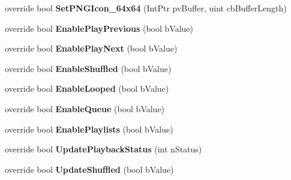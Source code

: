 \begin{DoxyCompactItemize}
override bool {\bfseries Set\+P\+N\+G\+Icon\+\_\+64x64} (Int\+Ptr pv\+Buffer, uint cb\+Buffer\+Length)
\item 
\mbox{\label{class_valve_1_1_steamworks_1_1_c_steam_music_remote_ae067653d7677e84907af56541c45c9e1}} 
override bool {\bfseries Enable\+Play\+Previous} (bool b\+Value)
\item 
\mbox{\label{class_valve_1_1_steamworks_1_1_c_steam_music_remote_a3e748d77856eb53e04e51a46e5579b48}} 
override bool {\bfseries Enable\+Play\+Next} (bool b\+Value)
\item 
\mbox{\label{class_valve_1_1_steamworks_1_1_c_steam_music_remote_a01a378e8d8ba52f35a26e26b49ae6fa8}} 
override bool {\bfseries Enable\+Shuffled} (bool b\+Value)
\item 
\mbox{\label{class_valve_1_1_steamworks_1_1_c_steam_music_remote_aa6c398cd2b4f545b9efc371d974858c4}} 
override bool {\bfseries Enable\+Looped} (bool b\+Value)
\item 
\mbox{\label{class_valve_1_1_steamworks_1_1_c_steam_music_remote_ae923e10c36c16dd2321f290d86801d72}} 
override bool {\bfseries Enable\+Queue} (bool b\+Value)
\item 
\mbox{\label{class_valve_1_1_steamworks_1_1_c_steam_music_remote_a95480e58886584e37b8a63b37261bdbe}} 
override bool {\bfseries Enable\+Playlists} (bool b\+Value)
\item 
\mbox{\label{class_valve_1_1_steamworks_1_1_c_steam_music_remote_acea0dfdb12d29455080b1d5a6ce5339e}} 
override bool {\bfseries Update\+Playback\+Status} (int n\+Status)
\item 
\mbox{\label{class_valve_1_1_steamworks_1_1_c_steam_music_remote_ae829ab8fbb911d463f53972ea11829c4}} 
override bool {\bfseries Update\+Shuffled} (bool b\+Value)
\item 

\end{DoxyCompactItemize}
